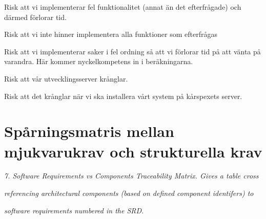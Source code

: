 \documentclass[a4paper, twoside, 11pt, titlepage]{article}
\begin{document}
	Risk att vi implementerar fel funktionalitet (annat än det efterfrågade) och därmed förlorar tid.

	Risk att vi inte hinner implementera alla funktioner som efterfrågas

	Risk att vi implementerar saker i fel ordning så att vi förlorar tid på att vänta på varandra. Här kommer nyckelkompetens in i beräkningarna.

	Risk att vår utvecklingsserver krånglar.

	Risk att det krånglar när vi ska installera vårt system på kårspexets server.

\clearpage
\section{Spårningsmatris mellan mjukvarukrav och strukturella krav}


\emph{7. Software Requirements vs Components Traceability Matrix. Gives a table cross}

\emph{referencing architectural components (based on defined component identifers) to}

\emph{software requirements numbered in the SRD.}

\clearpage
	\appendix
\end{document}

